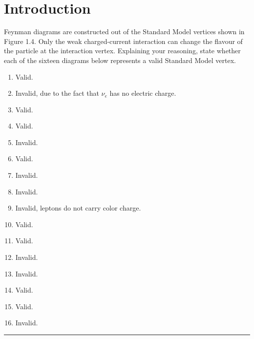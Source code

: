 \section{Introduction}

\begin{problem}{1.1}
Feynman diagrams are constructed out of the Standard Model vertices shown in Figure 1.4.
Only the weak charged-current interaction can change the flavour of the particle at the interaction vertex.
Explaining your reasoning, state whether each of the sixteen diagrams below represents a valid Standard Model vertex.
\end{problem}
\begin{solution}
\begin{enumerate}[label=(\alph*)]
    \item Valid. 
    \item Invalid, due to the fact that $\nu_e$ has no electric charge. 
    \item Valid.
    \item Valid.
    \item Invalid.
    \item Valid.
    \item Invalid.
    \item Invalid.
    \item Invalid, leptons do not carry color charge.
    \item Valid. 
    \item Valid.
    \item Invalid.
    \item Invalid.
    \item Valid.
    \item Valid.
    \item Invalid.
\end{enumerate}
\end{solution} 
\noindent\rule{7in}{1.5pt}
    
    

